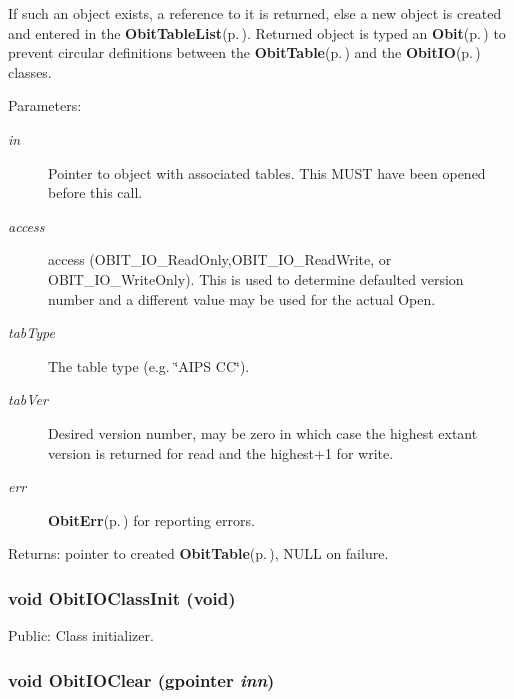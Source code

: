 If such an object exists, a reference to it is returned, else a new object is created and entered in the {\bf Obit\-Table\-List}{\rm (p.\,\pageref{structObitTableList})}. Returned object is typed an {\bf Obit}{\rm (p.\,\pageref{structObit})} to prevent circular definitions between the {\bf Obit\-Table}{\rm (p.\,\pageref{structObitTable})} and the {\bf Obit\-IO}{\rm (p.\,\pageref{structObitIO})} classes. \begin{Desc}
\item[Parameters:]
\begin{description}
\item[{\em in}]Pointer to object with associated tables. This MUST have been opened before this call. \item[{\em access}]access (OBIT\_\-IO\_\-Read\-Only,OBIT\_\-IO\_\-Read\-Write, or OBIT\_\-IO\_\-Write\-Only). This is used to determine defaulted version number and a different value may be used for the actual Open. \item[{\em tab\-Type}]The table type (e.g. \char`\"{}AIPS CC\char`\"{}). \item[{\em tab\-Ver}]Desired version number, may be zero in which case the highest extant version is returned for read and the highest+1 for write. \item[{\em err}]{\bf Obit\-Err}{\rm (p.\,\pageref{structObitErr})} for reporting errors. \end{description}
\end{Desc}
\begin{Desc}
\item[Returns:]pointer to created {\bf Obit\-Table}{\rm (p.\,\pageref{structObitTable})}, NULL on failure. \end{Desc}
\subsubsection{\setlength{\rightskip}{0pt plus 5cm}void Obit\-IOClass\-Init (void)}\label{ObitIO_8c_a33}


Public: Class initializer. 

\subsubsection{\setlength{\rightskip}{0pt plus 5cm}void Obit\-IOClear (gpointer {\em inn})}\label{ObitIO_8c_a4}


